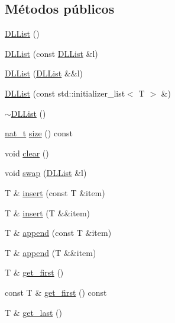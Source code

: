 \subsection*{Métodos públicos}
\begin{DoxyCompactItemize}
\item 
\hyperlink{class_designar_1_1_d_l_list_af85c4b65efde3c33ad011bf6bb7444b0}{D\+L\+List} ()
\item 
\hyperlink{class_designar_1_1_d_l_list_a4be2c1cdec495bacc879851956e96d9d}{D\+L\+List} (const \hyperlink{class_designar_1_1_d_l_list}{D\+L\+List} \&l)
\item 
\hyperlink{class_designar_1_1_d_l_list_a8408964dd17ca747a9a21b141b05630e}{D\+L\+List} (\hyperlink{class_designar_1_1_d_l_list}{D\+L\+List} \&\&l)
\item 
\hyperlink{class_designar_1_1_d_l_list_a8a6c4e93a8eaf2b113c1b86d0e05f406}{D\+L\+List} (const std\+::initializer\+\_\+list$<$ T $>$ \&)
\item 
\hyperlink{class_designar_1_1_d_l_list_a095cfa30b7eba01f1dc7e3fe6d35f013}{$\sim$\+D\+L\+List} ()
\item 
\hyperlink{namespace_designar_aa72662848b9f4815e7bf31a7cf3e33d1}{nat\+\_\+t} \hyperlink{class_designar_1_1_d_l_list_a77234df6ebb6620ecf124e1810d9741c}{size} () const
\item 
void \hyperlink{class_designar_1_1_d_l_list_a0b617ee4b2f03b58b74630f79566f1b8}{clear} ()
\item 
void \hyperlink{class_designar_1_1_d_l_list_a34bdcc8016583c3e0ab50b4d3a87117b}{swap} (\hyperlink{class_designar_1_1_d_l_list}{D\+L\+List} \&l)
\item 
T \& \hyperlink{class_designar_1_1_d_l_list_ad153fdaa8982b2276266e1e0dbb8b773}{insert} (const T \&item)
\item 
T \& \hyperlink{class_designar_1_1_d_l_list_a4a88465e07f8708eea591614b5822bb6}{insert} (T \&\&item)
\item 
T \& \hyperlink{class_designar_1_1_d_l_list_a0999bcc1ce1d5b89d54c9993735dc469}{append} (const T \&item)
\item 
T \& \hyperlink{class_designar_1_1_d_l_list_a62918b133f72c5fa1c580f823642e5fa}{append} (T \&\&item)
\item 
T \& \hyperlink{class_designar_1_1_d_l_list_aa089dc5d48f092cc91d2237606e131e7}{get\+\_\+first} ()
\item 
const T \& \hyperlink{class_designar_1_1_d_l_list_a7dc30042ed6cd04f964504e2ff2e5653}{get\+\_\+first} () const
\item 
T \& \hyperlink{class_designar_1_1_d_l_list_a94c9be82f4ec5a3579e84027c421e073}{get\+\_\+last} ()

\end{DoxyCompactItemize}
